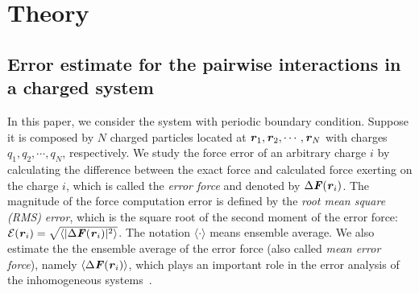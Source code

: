 \documentclass[aps,pre,preprint]{revtex4}
\renewcommand{\v}[1]{\textbf{\textit{#1}}}
\begin{document}



\section{Theory}

\subsection{Error estimate for
  the pairwise interactions in a charged system}

In this paper, we consider the system with periodic boundary condition.
Suppose it is
composed by $N$ charged particles located at $\v r_1, \v r_2, \cdots,
\v r_N$ with charges $q_1, q_2, \cdots, q_N$, respectively.  We study
the force error of an arbitrary charge $i$ by calculating the
difference between the exact force and calculated force exerting on
the charge $i$, which is called the \emph{error force}
\cite{wang2012} and denoted by $\Delta \v F(\v r_i)$.
The magnitude of the force computation error 
is defined by the \emph{root mean square (RMS)} \emph{error}, which is
the square root of the second moment of the error force: $\mathcal
E(\v r_i) = \sqrt{\langle\vert\Delta\v F(\v r_i)\vert^2\rangle}$.  The
notation $\langle\cdot\rangle$ means ensemble average.  We also
estimate the the ensemble average of the error force (also called
\emph{mean error force}), namely $\langle\Delta\v F(\v r_i)\rangle$,
which plays an important role in the error analysis of the
inhomogeneous systems~\cite{wang2012}.
\end{document}
